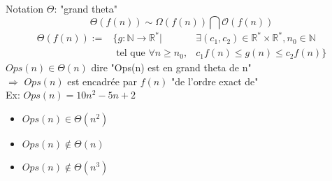 \documentclass{article}
\begin{document}
\begin{preview}
Notation $\Theta$: "grand theta"
    $$\Theta(f(n)) \sim \Omega(f(n)) \bigcap \mathcal{O}(f(n))$$
    \begin{eqnarray*}
    \Theta(f(n)) := &\{g: \mathbb{N} \rightarrow \mathbb{R}^* | & \exists (c_1,c_2) \in \mathbb{R}^* \times \mathbb{R}^*, n_0 \in \mathbb{N} \\
    &\mbox{ tel que } \forall n \geq n_0, & c_1f(n) \leq g(n) \leq c_2f(n)\}
    \end{eqnarray*}
    $Ops(n) \in \Theta(n)$ dire "Ops(n) est en grand theta de n"\\
    $\Rightarrow$ $Ops(n)$ est encadrée par $f(n)$ "de l'ordre exact de"\\
    \vspace{3mm}
    Ex:  $Ops(n) = 10 n^2 - 5 n + 2$
    \begin{minipage}{0.5\textwidth}
    \begin{itemize}
        \item $Ops(n) \in \Theta(n^2)$
        \item $Ops(n) \not\in \Theta(n)$
        \item $Ops(n) \not\in \Theta(n^3)$
    \end{itemize}
    \end{minipage}
 \end{preview}
\end{document}
